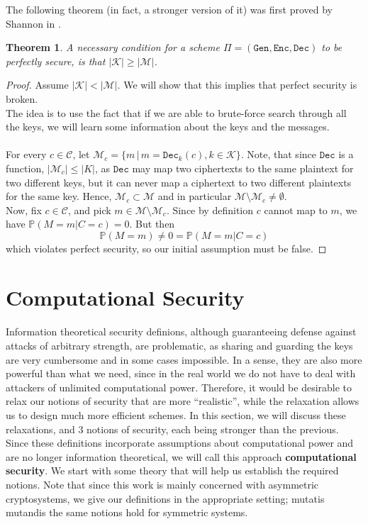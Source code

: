 \documentclass{article}
\newtheorem{theorem}{Theorem}[section]
\theoremstyle{definition}
\newcommand{\Enc}{\texttt{Enc}}
\newcommand{\Dec}{\texttt{Dec}}
\newcommand{\Gen}{\texttt{Gen}}
\newcommand{\M}{\mathcal{M}}
\renewcommand{\C}{\mathcal{C}}
\newcommand{\K}{\mathcal{K}}
\newcommand{\Prob}{\mathbb{P}}
\begin{document}
The following theorem (in fact, a stronger version of it) was first proved by
Shannon in \cite{shannon1949communication}.
\begin{theorem}
A necessary condition for a scheme $\Pi = (\Gen, \Enc, \Dec)$ to be perfectly secure, is that $|\K|
\geq |\M|$.
\end{theorem}
\begin{proof}
  Assume $|\K| < |\M|$. We will show that this implies that perfect security is broken.\\
  The idea is to use the fact that if we are able to brute-force search through
  all the keys, we will learn some information about the keys and the messages.
  \paragraph{}
  For every $c \in \C$, let $\M_c = \{m \,|\, m = \Dec_k(c), k \in \K\}$.
  Note, that since $\Dec$ is a function, $|\M_c| \leq |K|$, as $\Dec$ may map two ciphertexts
  to the same plaintext for two different keys, but it can never map a
  ciphertext to two different plaintexts for the same key. Hence, $\M_c \subset
  \M$ and in particular $\M \setminus \M_c \neq \emptyset$.\\
  Now, fix $c \in \C$, and pick $m \in \M \setminus \M_c$. Since by definition
  $c$ cannot map to $m$, we have $\Prob(M=m | C = c) = 0$. But then
  \[
    \Prob(M=m) \neq 0 = \Prob(M=m | C=c)
  \]
  which violates perfect security, so our initial assumption must be false.
\end{proof}
\section{Computational Security}
\paragraph{}
Information theoretical security definions, although guaranteeing defense
against attacks of arbitrary strength, are problematic, as sharing and guarding
the keys are very cumbersome and in some cases impossible. In a sense, they are
also more powerful than what we need, since in the real world we do not have to
deal with attackers of unlimited computational power. Therefore, it would be
desirable to relax our notions of security that are more ``realistic'', while
the relaxation allows us to design much more efficient schemes.
In this section, we will discuss these relaxations, and 3 notions of security,
each being stronger than the previous. Since these definitions incorporate
assumptions about computational power and are no longer information theoretical,
we will call this approach \textbf{computational security}. We start with some
theory that will help us establish the required notions. Note that since this
work is mainly concerned with asymmetric cryptosystems, we give our definitions
in the appropriate setting; mutatis mutandis the same notions hold for symmetric systems.
\end{document}
